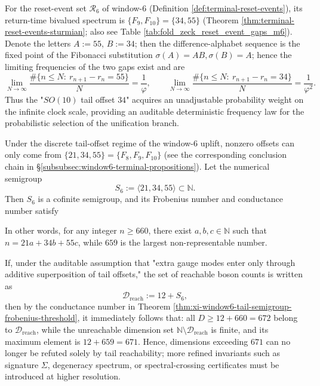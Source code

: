 \begin{corollary}\label{cor:xi-window6-reset-clock-gap-frequencies}
For the reset-event set \(\mathcal R_6\) of window-\(6\) (Definition \ref{def:terminal-reset-events}), its return-time bivalued spectrum is
\(\{F_9,F_{10}\}=\{34,55\}\) (Theorem \ref{thm:terminal-reset-events-sturmian}; also see Table \ref{tab:fold_zeck_reset_event_gaps_m6}).
Denote the letters \(A:=55\), \(B:=34\); then the difference-alphabet sequence is the fixed point of the Fibonacci substitution \(\sigma(A)=AB,\sigma(B)=A\); hence the limiting frequencies of the two gaps exist and are
\[
\lim_{N\to\infty}\frac{\#\{n\le N:\ r_{n+1}-r_n=55\}}{N}=\frac{1}{\varphi},
\qquad
\lim_{N\to\infty}\frac{\#\{n\le N:\ r_{n+1}-r_n=34\}}{N}=\frac{1}{\varphi^2}.
\]
Thus the "\(SO(10)\) tail offset \(34\)" acquires an unadjustable probability weight on the infinite clock scale, providing an auditable deterministic frequency law for the probabilistic selection of the unification branch.
\end{corollary}

\begin{theorem}\label{thm:xi-window6-tail-semigroup-frobenius-threshold}
Under the discrete tail-offset regime of the window-\(6\) uplift, nonzero offsets can only come from
\(\{21,34,55\}=\{F_8,F_9,F_{10}\}\) (see the corresponding conclusion chain in \S\ref{subsubsec:window6-terminal-propositions}).
Let the numerical semigroup
\[
S_6:=\langle 21,34,55\rangle\subset\mathbb N.
\]
Then \(S_6\) is a cofinite semigroup, and its Frobenius number and conductance number satisfy

In other words, for any integer \(n\ge 660\), there exist \(a,b,c\in\mathbb N\) such that
\(
n=21a+34b+55c
\), while \(659\) is the largest non-representable number.
\end{theorem}

\begin{corollary}\label{cor:xi-window6-dimension-sieve-finite}
If, under the auditable assumption that "extra gauge modes enter only through additive superposition of tail offsets," the set of reachable boson counts is written as
\[
\mathcal D_{\mathrm{reach}}:=12+S_6,
\]
then by the conductance number in Theorem \ref{thm:xi-window6-tail-semigroup-frobenius-threshold}, it immediately follows that:
all \(D\ge 12+660=672\) belong to \(\mathcal D_{\mathrm{reach}}\), while the unreachable dimension set \(\mathbb N\setminus\mathcal D_{\mathrm{reach}}\) is finite, and its maximum element is \(12+659=671\).
Hence, dimensions exceeding \(671\) can no longer be refuted solely by tail reachability; more refined invariants such as signature \(\Sigma\), degeneracy spectrum, or spectral-crossing certificates must be introduced at higher resolution.
\end{corollary}

